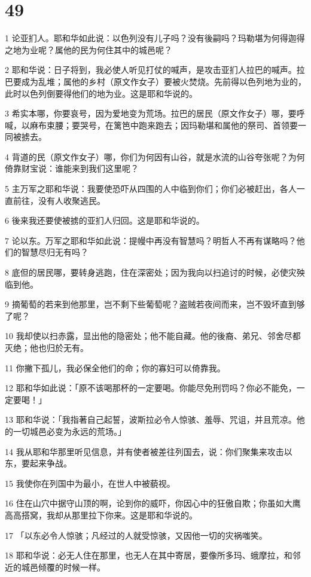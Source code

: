 \chapter{49}

\par 1 论亚扪人。耶和华如此说：以色列没有儿子吗？没有後嗣吗？玛勒堪为何得迦得之地为业呢？属他的民为何住其中的城邑呢？
\par 2 耶和华说：日子将到，我必使人听见打仗的喊声，是攻击亚扪人拉巴的喊声。拉巴要成为乱堆；属他的乡村（原文作女子）要被火焚烧。先前得以色列地为业的，此时以色列倒要得他们的地为业。这是耶和华说的。
\par 3 希实本哪，你要哀号，因为爱地变为荒场。拉巴的居民（原文作女子）哪，要呼喊，以麻布束腰；要哭号，在篱笆中跑来跑去；因玛勒堪和属他的祭司、首领要一同被掳去。
\par 4 背道的民（原文作女子）哪，你们为何因有山谷，就是水流的山谷夸张呢？为何倚靠财宝说：谁能来到我们这里呢？
\par 5 主万军之耶和华说：我要使恐吓从四围的人中临到你们；你们必被赶出，各人一直前往，没有人收聚逃民。
\par 6 後来我还要使被掳的亚扪人归回。这是耶和华说的。
\par 7 论以东。万军之耶和华如此说：提幔中再没有智慧吗？明哲人不再有谋略吗？他们的智慧尽归无有吗？
\par 8 底但的居民哪，要转身逃跑，住在深密处；因为我向以扫追讨的时候，必使灾殃临到他。
\par 9 摘葡萄的若来到他那里，岂不剩下些葡萄呢？盗贼若夜间而来，岂不毁坏直到够了呢？
\par 10 我却使以扫赤露，显出他的隐密处；他不能自藏。他的後裔、弟兄、邻舍尽都灭绝；他也归於无有。
\par 11 你撇下孤儿，我必保全他们的命；你的寡妇可以倚靠我。
\par 12 耶和华如此说：「原不该喝那杯的一定要喝。你能尽免刑罚吗？你必不能免，一定要喝！」
\par 13 耶和华说：「我指著自己起誓，波斯拉必令人惊骇、羞辱、咒诅，并且荒凉。他的一切城邑必变为永远的荒场。」
\par 14 我从耶和华那里听见信息，并有使者被差往列国去，说：你们聚集来攻击以东，要起来争战。
\par 15 我使你在列国中为最小，在世人中被藐视。
\par 16 住在山穴中据守山顶的啊，论到你的威吓，你因心中的狂傲自欺；你虽如大鹰高高搭窝，我却从那里拉下你来。这是耶和华说的。
\par 17 「以东必令人惊骇；凡经过的人就受惊骇，又因他一切的灾祸嗤笑。
\par 18 耶和华说：必无人住在那里，也无人在其中寄居，要像所多玛、蛾摩拉，和邻近的城邑倾覆的时候一样。
